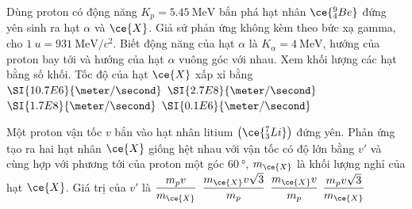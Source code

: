\begin{ex}
	Dùng proton có động năng $K_p=\SI{5.45}{\mega\electronvolt}$ bắn phá hạt nhân $\ce{^9_4Be}$ đứng yên sinh ra hạt $\alpha$ và $\ce{X}$. Giả sử phản ứng không kèm theo bức xạ gamma, cho $\SI{1}{u}=\SI{931}{\mega\electronvolt/c^2}$. Biết động năng của hạt $\alpha$ là $K_\alpha=\SI{4}{\mega\electronvolt}$, hướng của proton bay tới và hướng của hạt $\alpha$ vuông góc với nhau. Xem khối lượng các hạt bằng số khối. Tốc độ của hạt $\ce{X}$ xấp xỉ bằng
	\choice
	{\True $\SI{10.7E6}{\meter/\second}$}
	{$\SI{2.7E8}{\meter/\second}$}
	{$\SI{1.7E8}{\meter/\second}$}
	{$\SI{0.1E6}{\meter/\second}$}
\end{ex}
\begin{ex}
	Một proton vận tốc $v$ bắn vào hạt nhân litium $\left(\ce{^7_3Li}\right)$ đứng yên. Phản ứng tạo ra hai hạt nhân $\ce{X}$ giống hệt nhau với vận tốc có độ lớn bằng $v'$ và cùng hợp với phương tới của proton một góc $\SI{60}{\degree}$, $m_{\ce{X}}$ là khối lượng nghỉ của hạt $\ce{X}$. Giá trị của $v'$ là
	\choice
	{\True $\dfrac{m_pv}{m_{\ce{X}}}$}
	{$\dfrac{m_{\ce{X}}v\sqrt{3}}{m_p}$}
	{$\dfrac{m_{\ce{X}}v}{m_p}$}
	{$\dfrac{m_pv\sqrt{3}}{m_{\ce{X}}}$}
\end{ex}
